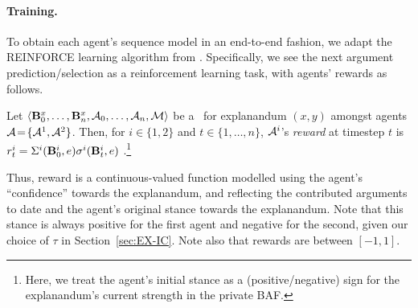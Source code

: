 \paragraph{Training.} 
\label{sec:FAX-impl}
To obtain each agent's sequence model in an end-to-end fashion,
we adapt the REINFORCE learning algorithm from \cite{mnih2014recurrent}.
Specifically, we see 
the next argument prediction/selection as a reinforcement learning task, 
with agents' rewards %
as follows.

\begin{definition}
\label{def:reward}
Let  $\langle \mathbf{B}^{x}_0, \ldots, \mathbf{B}^{x}_{n}, \mathcal{ A}_0, \ldots,\mathcal{ A}_n, \mathcal{M} 
    \rangle$ be a \FAXIC\ for explanandum $(x,y)$ amongst agents $\mathcal{ A} \!=\! \{ \mathcal{ A}^1, \mathcal{ A}^2 \}$. 
    Then, for $i\!\in\! \{ 1, 2 \}$ and $t \!\in\! \{1, \ldots, n\}$, %
    $ \mathcal{ A}^i$'s \emph{reward} at timestep $t$ is $\rewardI_t = \StanceI(\BAFi_0, \arge)\SFi(%
    \BAFi_t, \arge)$%
    .\footnote{Here, we treat the agent's initial stance as a (positive/negative) sign  for the explanandum's current strength in the %
     private BAF.}
    \label{def:reward}
\end{definition}


Thus, %
reward is 
a continuous-valued function modelled using the agent's ``confidence'' towards the explanandum, and reflecting the contributed arguments to date and the agent's original stance towards the explanandum. Note that this stance is always positive for the first agent and negative for the second, given our choice of $\tau$ in Section~\ref{sec:EX-IC}. %
Note also that rewards are 
between $[-1, 1]$. %

